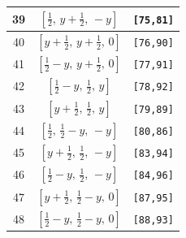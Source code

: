 \documentclass[fleqn,8pt]{jsarticle}
\begin{document}
\begin{longtable}{ccc}
39 & $\left[ \frac{1}{2},\, y + \frac{1}{2},\, - y \right]$ & {\tt [75,81]} \\ \hline
40 & $\left[ y + \frac{1}{2},\, y + \frac{1}{2},\, 0 \right]$ & {\tt [76,90]} \\ \hline
41 & $\left[ \frac{1}{2} - y,\, y + \frac{1}{2},\, 0 \right]$ & {\tt [77,91]} \\ \hline
42 & $\left[ \frac{1}{2} - y,\, \frac{1}{2},\, y \right]$ & {\tt [78,92]} \\ \hline
43 & $\left[ y + \frac{1}{2},\, \frac{1}{2},\, y \right]$ & {\tt [79,89]} \\ \hline
44 & $\left[ \frac{1}{2},\, \frac{1}{2} - y,\, - y \right]$ & {\tt [80,86]} \\ \hline
45 & $\left[ y + \frac{1}{2},\, \frac{1}{2},\, - y \right]$ & {\tt [83,94]} \\ \hline
46 & $\left[ \frac{1}{2} - y,\, \frac{1}{2},\, - y \right]$ & {\tt [84,96]} \\ \hline
47 & $\left[ y + \frac{1}{2},\, \frac{1}{2} - y,\, 0 \right]$ & {\tt [87,95]} \\ \hline
48 & $\left[ \frac{1}{2} - y,\, \frac{1}{2} - y,\, 0 \right]$ & {\tt [88,93]} \\
\end{longtable}
\renewcommand{\arraystretch}{1.2}
\end{document}
